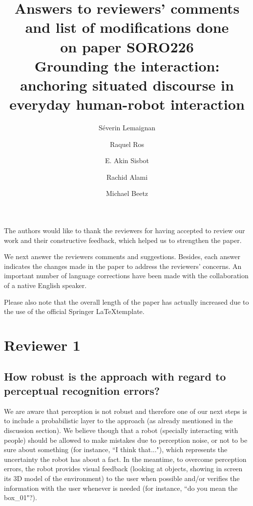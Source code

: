 \documentclass[11pt]{article}
\title{Answers to reviewers' comments and list of modifications done\\ on paper SORO226\\
\LARGE{\textbf{Grounding the interaction: anchoring situated discourse in everyday human-robot interaction}}}
\author{S\'everin Lemaignan \and Raquel Ros \and E. Akin Sisbot \and Rachid Alami \and Michael Beetz}
\begin{document}
\maketitle

The authors would like to thank the reviewers for having accepted to review our work and their constructive feedback, which helped us to strengthen the paper.

We next answer the reviewers comments and suggestions. Besides, each answer
indicates the changes made in the paper to address the reviewers' concerns. An
important number of language corrections have been made with the collaboration of a native English speaker.

Please also note that the overall length of the paper has actually 
increased due to the use of the official Springer \LaTeX template.




\section{Reviewer 1}

\subsection{How robust is the approach with regard to perceptual recognition
errors?}

We are aware that perception is not robust and therefore one of our next steps
is to include a probabilistic layer to the approach (as already mentioned in
the discussion section). We believe though that a robot (specially interacting
with people) should be allowed to make mistakes due to perception noise, or not
to be sure about something (for instance, ``I think that..."), which represents
the uncertainty the robot has about a fact. In the meantime, to overcome
perception errors, the robot provides visual feedback (looking at objects,
showing in screen its 3D model of the environment) to the user when possible
and/or verifies the information with the user whenever is needed (for instance,
``do you mean the box\_01"?). 
\end{document}
